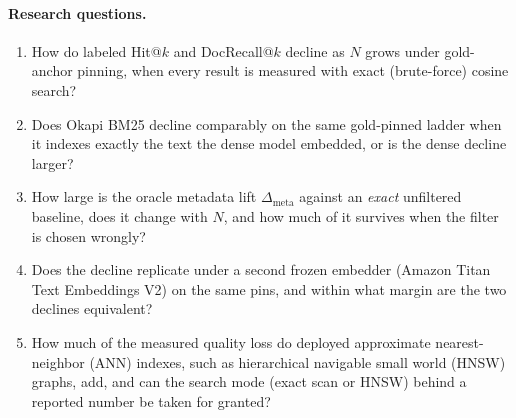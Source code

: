 \documentclass{ieeeaccess}
\makeatletter
\DeclareRobustCommand{\_}{\ifmmode\nfss@text{\textunderscore}\else\textunderscore\allowbreak\fi}
\makeatother
\begin{document}
\paragraph{Research questions.}
\begin{enumerate}
\item[\textbf{RQ1}] How do labeled Hit@$k$ and DocRecall@$k$ decline as $N$ grows under gold-anchor pinning, when every result is measured with exact (brute-force) cosine search?
\item[\textbf{RQ2}] Does Okapi BM25 decline comparably on the same gold-pinned ladder when it indexes exactly the text the dense model embedded, or is the dense decline larger?
\item[\textbf{RQ3}] How large is the oracle metadata lift $\Delta_{\mathrm{meta}}$ against an \emph{exact} unfiltered baseline, does it change with $N$, and how much of it survives when the filter is chosen wrongly?
\item[\textbf{RQ4}] Does the decline replicate under a second frozen embedder (Amazon Titan Text Embeddings V2) on the same pins, and within what margin are the two declines equivalent?
\item[\textbf{RQ5}] How much of the measured quality loss do deployed approximate nearest-neighbor (ANN) indexes, such as hierarchical navigable small world (HNSW) graphs, add, and can the search mode (exact scan or HNSW) behind a reported number be taken for granted?
\end{enumerate}
\end{document}
